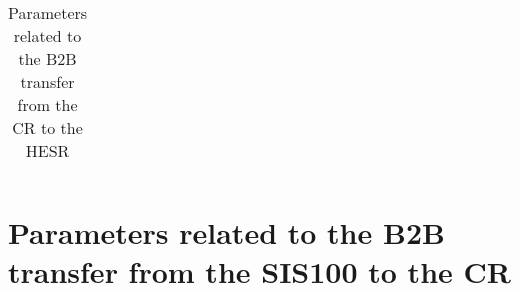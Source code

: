 \begin{longtable}{ | c | c | c | c | c | c |}
\caption{Parameters related to the B2B transfer from the CR to the HESR}
\label{CRtoHESR}
    \end{longtable}
 
 

\newpage
\section{Parameters related to the B2B transfer from the SIS100 to the CR}
\label{100toCR}

